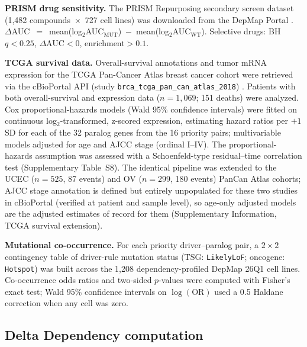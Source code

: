 \documentclass[11pt,a4paper]{article}
\begin{document}
\textbf{PRISM drug sensitivity.} The PRISM Repurposing secondary screen dataset (1,482 compounds~$\times$~727 cell lines) was downloaded from the DepMap Portal \cite{Corsello2020}. $\Delta$AUC~$=$~mean(log$_2$AUC$_\text{MUT}$)~$-$~mean(log$_2$AUC$_\text{WT}$). Selective drugs: BH $q<0.25$, $\Delta$AUC$<0$, enrichment$>0.1$.

\textbf{TCGA survival data.} Overall-survival annotations and tumor mRNA expression for the TCGA Pan-Cancer Atlas breast cancer cohort were retrieved via the cBioPortal API (study \texttt{brca\_tcga\_pan\_can\_atlas\_2018}) \cite{Liu2018,Cerami2012}. Patients with both overall-survival and expression data ($n=1{,}069$; 151 deaths) were analyzed. Cox proportional-hazards models (Wald 95\% confidence intervals) were fitted on continuous log$_2$-transformed, z-scored expression, estimating hazard ratios per $+1$ SD for each of the 32 paralog genes from the 16 priority pairs; multivariable models adjusted for age and AJCC stage (ordinal I--IV). The proportional-hazards assumption was assessed with a Schoenfeld-type residual--time correlation test (Supplementary Table~S8). The identical pipeline was extended to the UCEC ($n=525$, 87 events) and OV ($n=299$, 180 events) PanCan Atlas cohorts; AJCC stage annotation is defined but entirely unpopulated for these two studies in cBioPortal (verified at patient and sample level), so age-only adjusted models are the adjusted estimates of record for them (Supplementary Information, TCGA survival extension).

\textbf{Mutational co-occurrence.} For each priority driver--paralog pair, a $2\times2$ contingency table of driver-rule mutation status (TSG: \texttt{LikelyLoF}; oncogene: \texttt{Hotspot}) was built across the 1{,}208 dependency-profiled DepMap 26Q1 cell lines. Co-occurrence odds ratios and two-sided $p$-values were computed with Fisher's exact test; Wald 95\% confidence intervals on $\log(\mathrm{OR})$ used a 0.5 Haldane correction when any cell was zero.

\subsection*{Delta Dependency computation}
\end{document}
